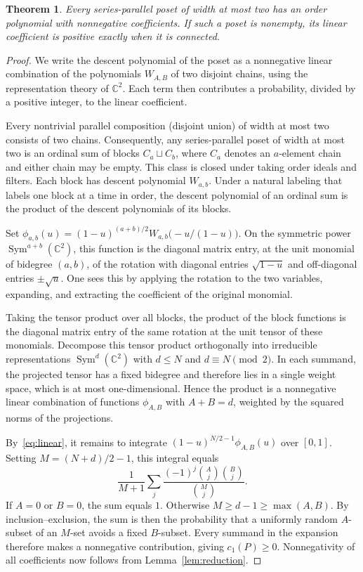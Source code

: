 \documentclass[11pt]{amsart}
\newtheorem{theorem}{Theorem}[section]
\theoremstyle{remark}
\numberwithin{equation}{section}
\newcommand{\lin}{c_1}
\begin{document}
\begin{theorem}\label{thm:sp}
Every series-parallel poset of width at most two has an order polynomial with
nonnegative coefficients. If such a poset is nonempty, its linear coefficient is
positive exactly when it is connected.
\end{theorem}

\begin{proof}
We write the descent polynomial of the poset as a nonnegative linear
combination of the polynomials $W_{A,B}$ of two disjoint chains, using
the representation theory of $\mathbb C^2$. Each term then contributes a
probability, divided by a positive integer, to the linear coefficient.

Every nontrivial parallel composition (disjoint union) of width at most two
consists of two chains. Consequently, any series-parallel poset of width at
most two is an ordinal sum of blocks $C_a\sqcup C_b$, where $C_a$ denotes an
$a$-element chain and either chain may be empty. This class is closed under
taking order ideals and filters. Each block has descent polynomial $W_{a,b}$.
Under a natural labeling that labels one block at a time in order, the descent
polynomial of an ordinal sum is the product of the descent polynomials of its
blocks.

Set $\phi_{a,b}(u)=(1-u)^{(a+b)/2}W_{a,b}\bigl(-u/(1-u)\bigr)$. On the
symmetric power $\operatorname{Sym}^{a+b}(\mathbb C^2)$, this function is the
diagonal matrix entry, at the unit monomial of bidegree $(a,b)$, of the
rotation with diagonal entries $\sqrt{1-u}$ and off-diagonal entries
$\pm\sqrt u$. One sees this by applying the rotation to the two variables,
expanding, and extracting the coefficient of the original monomial.

Taking the tensor product over all blocks, the product of the block functions
is the diagonal matrix entry of the same rotation at the unit tensor of these
monomials. Decompose this tensor product orthogonally into irreducible
representations $\operatorname{Sym}^d(\mathbb C^2)$ with $d\le N$ and
$d\equiv N\pmod2$. In each summand, the projected tensor has a fixed bidegree
and therefore lies in a single weight space, which is at most one-dimensional.
Hence the product is a nonnegative linear combination of functions $\phi_{A,B}$
with $A+B=d$, weighted by the squared norms of the projections.

By~\eqref{eq:linear}, it remains to integrate $(1-u)^{N/2-1}\phi_{A,B}(u)$ over
$[0,1]$. Setting $M=(N+d)/2-1$, this integral equals
\[
 \frac1{M+1}\sum_j\frac{(-1)^j\binom Aj\binom Bj}{\binom Mj}.
\]
If $A=0$ or $B=0$, the sum equals $1$. Otherwise $M\ge d-1\ge\max(A,B)$. By
inclusion--exclusion, the sum is then the probability that a uniformly random
$A$-subset of an $M$-set avoids a fixed $B$-subset. Every summand in the
expansion therefore makes a nonnegative contribution, giving $\lin(P)\ge0$.
Nonnegativity of all coefficients now follows from Lemma~\ref{lem:reduction}.


\end{proof}
\end{document}
